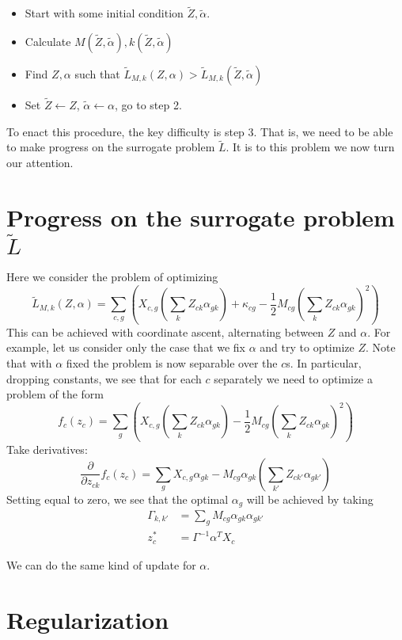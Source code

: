 \documentclass{article}
\begin{document}
\begin{itemize}
    \item Start with some initial condition $\tilde Z,\tilde \alpha$.
    \item Calculate $M(\tilde Z,\tilde \alpha),k(\tilde Z,\tilde \alpha)$
    \item Find $Z,\alpha$ such that $\tilde L_{M,k}(Z,\alpha)>\tilde L_{M,k}(\tilde Z,\tilde \alpha)$
    \item Set $\tilde Z \gets Z$, $\tilde \alpha \gets \alpha$, go to step 2.
\end{itemize}

To enact this procedure, the key difficulty is step 3.  That is, we need to be able to make progress on the surrogate problem $\tilde L$.  It is to this problem we now turn our attention.

\section{Progress on the surrogate problem $\tilde L$}

Here we consider the problem of optimizing 
\[
\tilde L_{M,k}(Z,\alpha) = \sum_{c,g} \left(X_{c,g}\left(\sum_k Z_{ck} \alpha_{gk}\right) + \kappa_{cg} - \frac{1}{2}M_{cg}\left(\sum_k Z_{ck} \alpha_{gk}\right)^2 \right)
\]
This can be achieved with coordinate ascent, alternating between $Z$ and $\alpha$.  For example, let us consider only the case that we fix $\alpha$ and try to optimize $Z$.  Note that with $\alpha$ fixed the problem is now separable over the $c$s.  In particular, dropping constants, we see that for each $c$ separately we need to optimize a problem of the form
\[
f_c(z_c) = \sum_{g} \left(X_{c,g}\left(\sum_k Z_{ck} \alpha_{gk}\right) - \frac{1}{2}M_{cg}\left(\sum_k Z_{ck} \alpha_{gk}\right)^2 \right)
\]
Take derivatives:
\[
\frac{\partial}{\partial z_{ck}}f_c(z_c) = \sum_{g} X_{c,g}\alpha_{gk} - M_{cg}\alpha_{gk}\left(\sum_{k'} Z_{ck'} \alpha_{gk'}\right) 
\]
Setting equal to zero, we see that the optimal $\alpha_g$ will be achieved by taking
\begin{align*}
\Gamma_{k,k'} &= \sum_g M_{cg}\alpha_{gk}\alpha_{gk'}\\
z_c^* &= \Gamma^{-1} \alpha^T X_c
\end{align*}

We can do the same kind of update for $\alpha$.

\section{Regularization}
\end{document}
